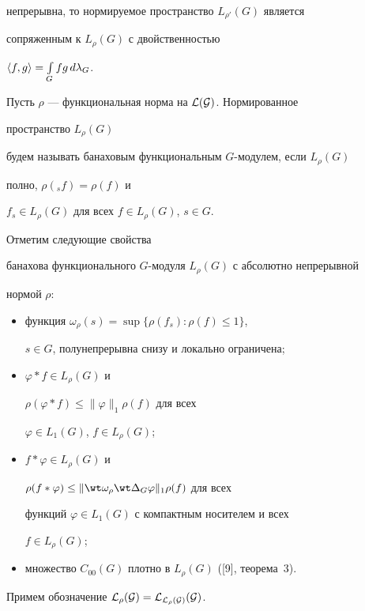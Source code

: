 непрерывна, то нормируемое пространство $L_{\rho'}(G)$ является


сопряженным к $L_\rho(G)$ с двойственностью


$\langle f,g\rangle=\int\limits_G fg\,d\lambda_G$.





Пусть $\rho$ --- функциональная норма на $\cal L(G)$. Нормированное


пространство $L_\rho(G)$


будем называть банаховым функциональным $G$-модулем, если $L_\rho(G)$


полно, $\rho({}_sf)=\rho(f)$ и


$f_s\in L_\rho(G)$ для всех $f\in L_\rho(G)$, $s\in G$.


Отметим следующие свойства


банахова функционального $G$-модуля $L_\rho(G)$ с абсолютно непрерывной


нормой $\rho$:


\begin{itemize}


\item[1)] функция $\omega_\rho(s)=\sup\{\rho(f_s):\rho(f)\le 1\}$,


$s\in G$, полунепрерывна снизу и локально ограничена;


\item[2)] $\varphi\ast f\in L_\rho(G)$ и


$\rho(\varphi\ast f)\le \|\varphi\|_1\rho(f)$ для всех


$\varphi\in L_1(G)$, $f\in L_\rho(G)$;


\item[3)] $f\ast\varphi\in L_\rho(G)$ и


$\rho(f\ast\varphi)\le\|\wt\omega_\rho\wt\Delta_G\varphi\|_1


\rho(f)$ для всех


функций $\varphi\in L_1(G)$ с компактным носителем и всех


$f\in L_\rho(G)$;


\item[4)] множество $C_{00}(G)$ плотно в $L_\rho(G)$ ([9], теорема~3).


\end{itemize}





Примем обозначение $\cal L_\rho(G)=\cal L_{L_\rho(G)}(G)$.





